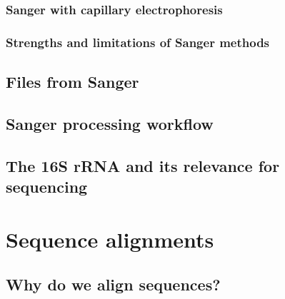 \documentclass[
  letterpaper,
]{scrbook}
\begin{document}
\hypertarget{sanger-with-capillary-electrophoresis}{%
\subsection*{Sanger with capillary
electrophoresis}\label{sanger-with-capillary-electrophoresis}}

\hypertarget{strengths-and-limitations-of-sanger-methods}{%
\subsection*{Strengths and limitations of Sanger
methods}\label{strengths-and-limitations-of-sanger-methods}}

\hypertarget{files-from-sanger}{%
\section*{Files from Sanger}\label{files-from-sanger}}

\hypertarget{sanger-processing-workflow}{%
\section*{Sanger processing workflow}\label{sanger-processing-workflow}}

\hypertarget{the-16s-rrna-and-its-relevance-for-sequencing}{%
\section*{The 16S rRNA and its relevance for
sequencing}\label{the-16s-rrna-and-its-relevance-for-sequencing}}

\hypertarget{sequence-alignments}{%
\chapter{Sequence alignments}\label{sequence-alignments}}

\hypertarget{why-do-we-align-sequences}{%
\section*{Why do we align sequences?}\label{why-do-we-align-sequences}}
\end{document}

